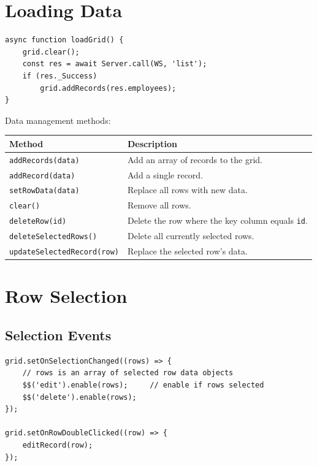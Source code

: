 \section{Loading Data}
\label{sec:grid-data}

\begin{lstlisting}[style=javascript]
async function loadGrid() {
    grid.clear();
    const res = await Server.call(WS, 'list');
    if (res._Success)
        grid.addRecords(res.employees);
}
\end{lstlisting}

\noindent
Data management methods:

\begin{longtable}{P{4.5cm}P{6cm}}
\toprule
\textbf{Method} & \textbf{Description} \\
\midrule
\endhead
\texttt{addRecords(data)} & Add an array of records to the grid. \\
\texttt{addRecord(data)} & Add a single record. \\
\texttt{setRowData(data)} & Replace all rows with new data. \\
\texttt{clear()} & Remove all rows. \\
\texttt{deleteRow(id)} & Delete the row where the key column equals \texttt{id}. \\
\texttt{deleteSelectedRows()} & Delete all currently selected rows. \\
\texttt{updateSelectedRecord(\allowbreak row)} & Replace the selected row's data. \\
\bottomrule
\end{longtable}

\section{Row Selection}
\label{sec:grid-selection}

\subsection{Selection Events}

\begin{lstlisting}[style=javascript]
grid.setOnSelectionChanged((rows) => {
    // rows is an array of selected row data objects
    $$('edit').enable(rows);     // enable if rows selected
    $$('delete').enable(rows);
});

grid.setOnRowDoubleClicked((row) => {
    editRecord(row);
});
\end{lstlisting}

